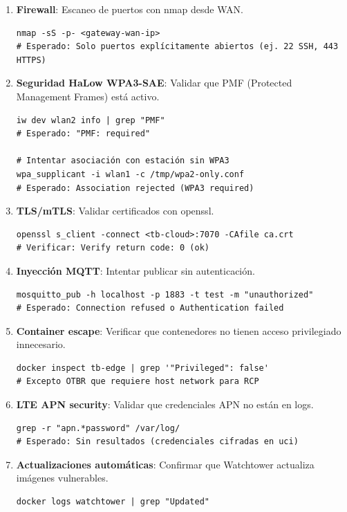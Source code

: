 \begin{enumerate}
    \item \textbf{Firewall}: Escaneo de puertos con nmap desde WAN.
    \begin{verbatim}
nmap -sS -p- <gateway-wan-ip>
# Esperado: Solo puertos explícitamente abiertos (ej. 22 SSH, 443 HTTPS)
    \end{verbatim}
    
    \item \textbf{Seguridad HaLow WPA3-SAE}: Validar que PMF (Protected Management Frames) está activo.
    \begin{verbatim}
iw dev wlan2 info | grep "PMF"
# Esperado: "PMF: required"

# Intentar asociación con estación sin WPA3
wpa_supplicant -i wlan1 -c /tmp/wpa2-only.conf
# Esperado: Association rejected (WPA3 required)
    \end{verbatim}
    
    \item \textbf{TLS/mTLS}: Validar certificados con openssl.
    \begin{verbatim}
openssl s_client -connect <tb-cloud>:7070 -CAfile ca.crt
# Verificar: Verify return code: 0 (ok)
    \end{verbatim}
    
    \item \textbf{Inyección MQTT}: Intentar publicar sin autenticación.
    \begin{verbatim}
mosquitto_pub -h localhost -p 1883 -t test -m "unauthorized"
# Esperado: Connection refused o Authentication failed
    \end{verbatim}
    
    \item \textbf{Container escape}: Verificar que contenedores no tienen acceso privilegiado innecesario.
    \begin{verbatim}
docker inspect tb-edge | grep '"Privileged": false'
# Excepto OTBR que requiere host network para RCP
    \end{verbatim}
    
    \item \textbf{LTE APN security}: Validar que credenciales APN no están en logs.
    \begin{verbatim}
grep -r "apn.*password" /var/log/
# Esperado: Sin resultados (credenciales cifradas en uci)
    \end{verbatim}
    
    \item \textbf{Actualizaciones automáticas}: Confirmar que Watchtower actualiza imágenes vulnerables.
    \begin{verbatim}
docker logs watchtower | grep "Updated"
    \end{verbatim}
\end{enumerate}


